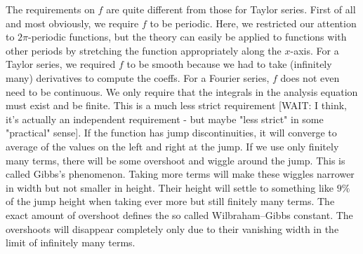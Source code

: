 \medskip
The requirements on $f$ are quite different from those for Taylor series. First of all and most obviously, we require $f$ to be periodic. Here, we restricted our attention to $2 \pi$-periodic functions, but the theory can easily be applied to functions with other periods by stretching the function appropriately along the $x$-axis.  For a Taylor series, we required $f$ to be smooth because we had to take (infinitely many) derivatives to compute the coeffs. For a Fourier series, $f$ does not even need to be continuous. We only require that the integrals in the analysis equation must exist and be finite. This is a much less strict requirement [WAIT: I think, it's actually an independent requirement - but maybe "less strict" in some "practical" sense]. If the function has jump discontinuities, it will converge to average of the values on the left and right at the jump. If we use only finitely many terms, there will be some overshoot and wiggle around the jump. This is called Gibbs's phenomenon. Taking more terms will make these wiggles narrower in width but not smaller in height. Their height will settle to something like $9\%$ of the jump height when taking ever more but still finitely many terms. The exact amount of overshoot defines the so called Wilbraham–Gibbs constant. The overshoots will disappear completely only due to their vanishing width in the limit of infinitely many terms.



